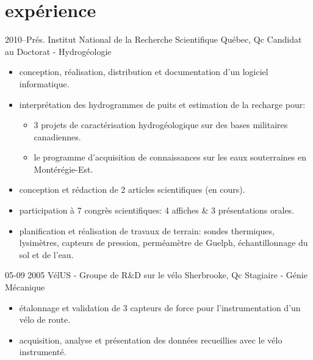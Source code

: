 \documentclass[]{friggeri-cv} %
\begin{document}
\section{expérience}
%
\begin{entrylist}
  \entryBul
    {2010--Prés.}
    {Institut National de la Recherche Scientifique}
    {Québec, Qc}
    {Candidat au Doctorat - Hydrogéologie}
    {
     \begin{itemize}[leftmargin=*]
       \setlength\itemsep{0pt}
       \item conception, réalisation, distribution et documentation d'un logiciel informatique.                      
       \item interprétation des hydrogrammes de puits et estimation de la recharge pour:
         \begin{itemize}[leftmargin=0.5cm]
           \item 3 projets de caractérisation hydrogéologique sur des bases militaires canadiennes.
           \item le programme d’acquisition de connaissances sur les eaux souterraines en Montérégie-Est.
         \end{itemize}
       \item conception et rédaction de 2 articles scientifiques (en cours).
       \item participation à 7 congrès scientifiques: 4 affiches \& 3 présentations orales.
       \item planification et réalisation de travaux de terrain: sondes thermiques, lysimètres, capteurs de pression, perméamètre de Guelph, échantillonnage du sol et de l'eau.
     \end{itemize}
     }
\end{entrylist}
\begin{entrylist}
  \entryBul
    {05-09 2005}
    {VélUS - Groupe de R\&D sur le vélo}
    {Sherbrooke, Qc}
    {Stagiaire - Génie Mécanique}
    {
     \begin{itemize}[leftmargin=*]
       \setlength\itemsep{0pt}
       \item étalonnage et validation de 3 capteurs de force pour l'instrumentation d'un vélo de route.
       \item acquisition, analyse et présentation des données recueillies avec le vélo instrumenté.
     \end{itemize}
     }
\end{entrylist}
\end{document}
